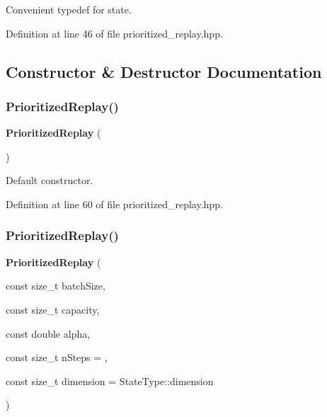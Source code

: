 Convenient typedef for state. 



Definition at line 46 of file prioritized\+\_\+replay.\+hpp.



\subsection{Constructor \& Destructor Documentation}
\mbox{\label{classmlpack_1_1rl_1_1PrioritizedReplay_a2d2ee6b689ad5f996c939be2f1f61ba0}} 
\subsubsection{Prioritized\+Replay()\hspace{0.1cm}{\footnotesize\ttfamily [1/2]}}
{\footnotesize\ttfamily \textbf{ Prioritized\+Replay} (\begin{DoxyParamCaption}{ }\end{DoxyParamCaption})\hspace{0.3cm}{\ttfamily [inline]}}



Default constructor. 



Definition at line 60 of file prioritized\+\_\+replay.\+hpp.

\mbox{\label{classmlpack_1_1rl_1_1PrioritizedReplay_a2754147b888db0a76084538e3426c4f9}} 
\subsubsection{Prioritized\+Replay()\hspace{0.1cm}{\footnotesize\ttfamily [2/2]}}
{\footnotesize\ttfamily \textbf{ Prioritized\+Replay} (\begin{DoxyParamCaption}\item[{const size\+\_\+t}]{batch\+Size,  }\item[{const size\+\_\+t}]{capacity,  }\item[{const double}]{alpha,  }\item[{const size\+\_\+t}]{n\+Steps = {},  }\item[{const size\+\_\+t}]{dimension = {\ttfamily StateType\+:\+:dimension} }\end{DoxyParamCaption})\hspace{0.3cm}{\ttfamily [inline]}}



